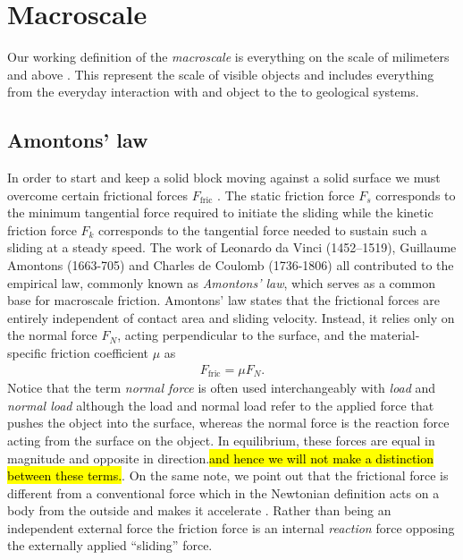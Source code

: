 \section{Macroscale}\label{sec:macroscale}
Our working definition of the \textit{macroscale} is everything on the scale of milimeters and above \cite{HUNG2015215}. This represent the scale of visible objects and includes everything from the everyday interaction with and object to the to geological systems. 




\subsection{Amontons’ law}
In order to start and keep a solid block moving against a solid surface we must
overcome certain frictional forces $F_{\text{fric}}$ \cite{gnecco_meyer_2015}.
The static friction force $F_s$ corresponds to the minimum tangential force
required to initiate the sliding while the kinetic friction force $F_k$
corresponds to the tangential force needed to sustain such a sliding at a steady
speed. The work of Leonardo da Vinci (1452–1519), Guillaume Amontons (1663-705)
and Charles de Coulomb (1736-1806) all contributed to the empirical law,
commonly known as \textit{Amontons’ law}, which serves as a common base for macroscale
friction. Amontons’ law states that the frictional forces are entirely
independent of contact area and sliding velocity. Instead, it relies only on
the normal force $F_N$, acting perpendicular to the surface, and the material-specific friction coefficient $\mu$ as
\begin{align}
  F_{\text{fric}} = \mu F_N.
  \label{eq:amonton}
\end{align}
Notice that the term \textit{normal force} is often used interchangeably with \textit{load} and \textit{normal load} although the load and normal load refer to the applied force that pushes the object into the surface, whereas the normal force is the reaction force acting from the surface on the object. In equilibrium, these forces are equal in magnitude and opposite in direction.\hl{and hence we will not make a distinction between these terms.}. On the same note, we point out that the frictional force is different from a conventional force which in the Newtonian definition acts on a body from the outside and makes it accelerate \cite{gao_frictional_2004}. Rather than being an independent external force the friction force is an internal \textit{reaction} force opposing the externally applied ``sliding'' force. 

